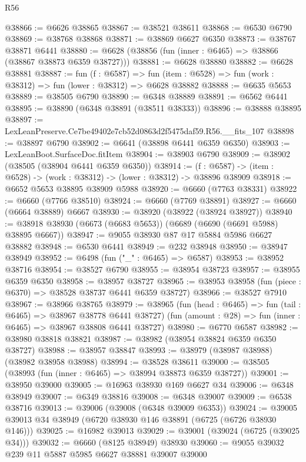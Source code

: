 \begin{lexlean}{R56}
\begin{coremodule}
@38866 := @6626 @38865
@38867 := @38521 @38611
@38868 := @6530 @6790
@38869 := @38768 @38868
@38871 := @38869 @6627 @6350
@38873 := @38767 @38871 @6441
@38880 := @6628 (@38856 (fun (inner : @6465) => @38866 (@38867 @38873 @6359 @38727)))
@38881 := @6628 @38880
@38882 := @6628 @38881
@38887 := fun (f : @6587) =>
  fun (item : @6528) => fun (work : @38312) => fun (lower : @38312) => @6628 @38882
@38888 := @6635 @5653
@38889 := @38505 @6790
@38890 := @6348 @38889
@38891 := @6562 @6441
@38895 := @38890 (@6348 @38891 (@38511 @38333))
@38896 := @38888 @38895
@38897 := LexLeanPreserve.Ce7be49402e7cb52d0863d2f5475daf59.R56.__fits_107
@38898 := @38897 @6790
@38902 := @6641 (@38898 @6441 @6359 @6350)
@38903 := LexLeanBoot.SurfaceDoc.fitItem
@38904 := @38903 @6790
@38909 := @38902 (@38505 (@38904 @6441 @6359 @6350))
@38914 := (f : @6587) -> (item : @6528) -> (work : @38312) -> (lower : @38312) -> @38896 @38909
@38918 := @6652 @5653 @38895 @38909 @5988
@38920 := @6660 (@7763 @38331)
@38922 := @6660 (@7766 @38510)
@38924 := @6660 (@7769 @38891)
@38927 := @6660 (@6664 @38889) @6667
@38930 := @38920 (@38922 (@38924 @38927))
@38940 := @38918 @38930 (@6673 (@6683 @5653)) (@6689 (@6690 (@6691 @5988) @38895 @6667))
@38947 := @9055 @38930 @87 @17 @5884 @5986 @6627 @38882
@38948 := @6530 @6441
@38949 := @232 @38948
@38950 := @38947 @38949
@38952 := @6498 (fun ("_" : @6465) => @6587)
@38953 := @38952 @38716
@38954 := @38527 @6790
@38955 := @38954 @38723
@38957 := @38955 @6359 @6350
@38958 := @38957 @38727
@38965 := @38953 @38958 (fun (piece : @6370) => @38528 @38737 @6441 @6359 @38727)
@38966 := @38527 @7910
@38967 := @38966 @38765
@38979 := @38965
    (fun (head : @6465) => fun (tail : @6465) => @38967 @38778 @6441 @38727)
    (fun (amount : @28) => fun (inner : @6465) => @38967 @38808 @6441 @38727)
@38980 := @6770 @6587
@38982 := @38980 @38818 @38821
@38987 := @38982 (@38954 @38824 @6359 @6350 @38727)
@38988 := @38957 @38847
@38993 := @38979 (@38987 @38988) (@38982 @38958 @38988)
@38994 := @38528 @38611
@39000 := @38505 (@38993 (fun (inner : @6465) => @38994 @38873 @6359 @38727))
@39001 := @38950 @39000
@39005 := @16963 @38930 @169 @6627 @34
@39006 := @6348 @38949
@39007 := @6349 @38816
@39008 := @6348 @39007
@39009 := @6538 @38716
@39013 := @39006 (@39008 (@6348 @39009 @6353))
@39024 := @39005 @39013 @34 @38949 (@6720 @38930 @146 @38891 (@6725 (@6726 @38930 @146)))
@39025 := @16982 @39013
@39029 := @39001 (@39024 (@6725 (@39025 @34)))
@39032 := @6660 (@8125 @38949) @38930
@39060 := @9055
    @39032
    @239
    @11
    @5887
    @5985
    @6627
    @38881
    @39007
    @39000

\end{coremodule}
\end{lexlean}
